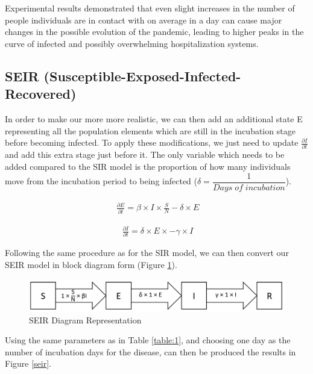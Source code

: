Experimental results demonstrated that even slight increases in the number of people individuals are in contact with on average in a day can cause major changes in the possible evolution of the pandemic, leading to higher peaks in the curve of infected and possibly overwhelming hospitalization systems.

\subsection{SEIR (Susceptible-Exposed-Infected-Recovered)}

In order to make our more more realistic, we can then add an additional state E representing all the population elements which are still in the incubation stage before becoming infected. To apply these modifications, we just need to update $\frac{\partial I}{\partial t}$ and add this extra stage just before it. The only variable which needs to be added compared to the SIR model is the proportion of how many individuals move from the incubation period to being infected ($\delta = \dfrac{1}{Days\;of\;incubation}$).

\useshortskip
\begin{align}
\ \frac{\partial E}{\partial t} = \beta \times I \times \frac{S}{N} -\delta \times E
\end{align}
\useshortskip

\useshortskip
\begin{align}
\ \frac{\partial I}{\partial t} = \delta \times E \times -\gamma \times I
\end{align}
\useshortskip

Following the same procedure as for the SIR model, we can then convert our SEIR model in block diagram form (Figure \ref{dseir}).

\begin{figure}[ht!]%
    \centering
    \includegraphics[width=0.75\linewidth]{latex/images/dseir.pdf}
    \caption{SEIR Diagram Representation}
    \label{dseir}
\end{figure}

Using the same parameters as in Table \ref{table:1}, and choosing one day as the number of incubation days for the disease, can then be produced the results in Figure \ref{seir}.

